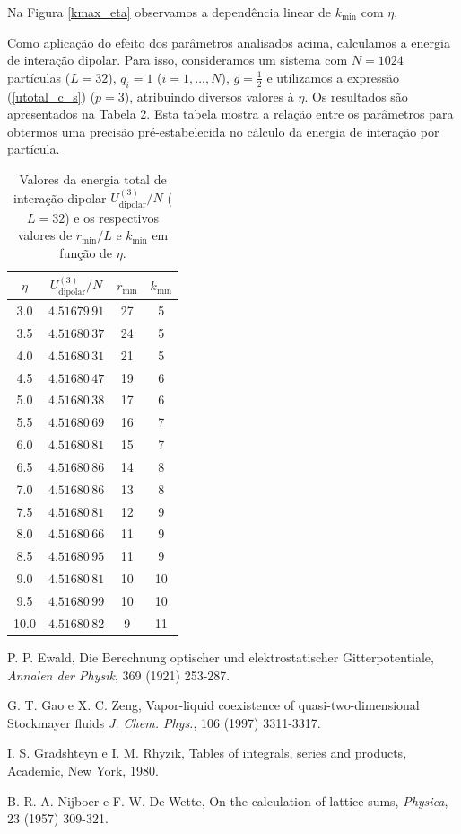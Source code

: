 \documentclass[twocolumn,a4,11pt]{article}
\begin{document}
Na Figura \ref{kmax_eta} observamos a dependência linear de $k_{\min}$ com $\eta$.

Como aplicação do efeito dos parâmetros analisados acima, calculamos a energia de interação dipolar. Para isso, consideramos um sistema com $N=1024$ partículas ($L=32$), $q_{i}=1$ ($i=1,...,N$), $g=\frac{1}{2}$ e utilizamos a expressão (\ref{utotal_c_s}) ($p=3$), atribuindo diversos valores à $\eta$. Os resultados são apresentados na Tabela 2. Esta tabela mostra a relação entre os parâmetros para obtermos uma precisão pré-estabelecida no cálculo da energia de interação por partícula.

\begin{table}[h]
\begin{center}
\begin{tabular}{c c c c} \hline
$\eta$ & $U_{\text{dipolar}}^{(3)}/N$ & $r_{\min}$ & $k_{\min}$\\
\hline
 3.0 & $4.51679\,91$ & 27 & 5  \\
 3.5 & $4.51680\,37$ & 24 & 5  \\
 4.0 & $4.51680\,31$ & 21 & 5  \\
 4.5 & $4.51680\,47$ & 19 & 6  \\
 5.0 & $4.51680\,38$ & 17 & 6  \\
 5.5 & $4.51680\,69$ & 16 & 7  \\
 6.0 & $4.51680\,81$ & 15 & 7  \\
 6.5 & $4.51680\,86$ & 14 & 8  \\
 7.0 & $4.51680\,86$ & 13 & 8  \\
 7.5 & $4.51680\,81$ & 12 & 9  \\
 8.0 & $4.51680\,66$ & 11 & 9  \\
 8.5 & $4.51680\,95$ & 11 & 9  \\
 9.0 & $4.51680\,81$ & 10 & 10 \\
 9.5 & $4.51680\,99$ & 10 & 10 \\
10.0 & $4.51680\,82$ & 9  & 11 \\
\hline
\end{tabular}
\caption{ {\small Valores da energia total de interação dipolar $U_{\text{dipolar}}^{(3)}/N$ ($L=32$) e os respectivos valores de $r_{\min}/L$ e $k_{\min}$ em função de $\eta$.}}
\end{center}
\label{tabela_dos_vizinhos}
\end{table}
\vspace*{-0.6cm}

\begin{thebibliography}{10}
P. P. Ewald, Die Berechnung optischer und elektrostatischer Gitterpotentiale, {\em Annalen der Physik}, 369 (1921) 253-287.

G. T. Gao e X. C. Zeng, Vapor-liquid coexistence of quasi-two-dimensional Stockmayer fluids {\em J. Chem. Phys.}, 106 (1997) 3311-3317.

I. S. Gradshteyn e I. M. Rhyzik, Tables of integrals, series and products, Academic, New York, 1980.

B. R. A. Nijboer e F. W. De Wette, On the calculation of lattice sums, {\em Physica}, 23 (1957) 309-321.

\end{thebibliography}
\end{document}

